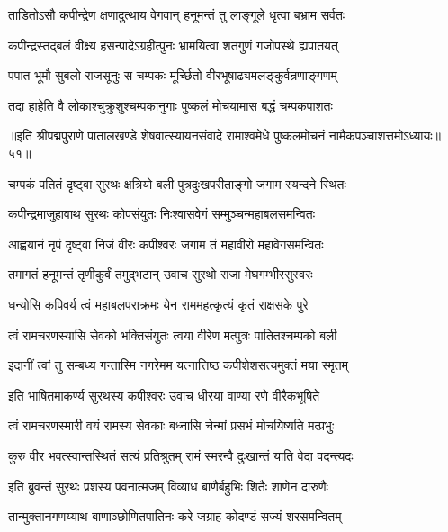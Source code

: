 \twolineshloka
{ताडितोऽसौ कपीन्द्रेण क्षणादुत्थाय वेगवान्}
{हनूमन्तं तु लाङ्गूले धृत्वा बभ्राम सर्वतः}%

\twolineshloka
{कपीन्द्रस्तद्बलं वीक्ष्य हसन्पादेऽग्रहीत्पुनः}
{भ्रामयित्वा शतगुणं गजोपस्थे ह्यपातयत्}%

\twolineshloka
{पपात भूमौ सुबलो राजसूनुः स चम्पकः}
{मूर्च्छितो वीरभूषाढ्यमलङ्कुर्वन्रणाङ्गणम्}%

\twolineshloka
{तदा हाहेति वै लोकाश्चुक्रुशुश्चम्पकानुगाः}
{पुष्कलं मोचयामास बद्धं चम्पकपाशतः}%

{॥इति श्रीपद्मपुराणे पातालखण्डे शेषवात्स्यायनसंवादे रामाश्वमेधे पुष्कलमोचनं नामैकपञ्चाशत्तमोऽध्यायः॥५१॥}



\twolineshloka
{चम्पकं पतितं दृष्ट्वा सुरथः क्षत्रियो बली}
{पुत्रदुःखपरीताङ्गो जगाम स्यन्दने स्थितः}%

\twolineshloka
{कपीन्द्रमाजुहावाथ सुरथः कोपसंयुतः}
{निःश्वासवेगं सम्मुञ्चन्महाबलसमन्वितः}%

\twolineshloka
{आह्वयानं नृपं दृष्ट्वा निजं वीरः कपीश्वरः}
{जगाम तं महावीरो महावेगसमन्वितः}%

\twolineshloka
{तमागतं हनूमन्तं तृणीकुर्वं तमुद्भटान्}
{उवाच सुरथो राजा मेघगम्भीरसुस्वरः}%


\twolineshloka
{धन्योसि कपिवर्य त्वं महाबलपराक्रमः}
{येन राममहत्कृत्यं कृतं राक्षसके पुरे}%

\twolineshloka
{त्वं रामचरणस्यासि सेवको भक्तिसंयुतः}
{त्वया वीरेण मत्पुत्रः पातितश्चम्पको बली}%

\twolineshloka
{इदानीं त्वां तु सम्बध्य गन्तास्मि नगरेमम}
{यत्नात्तिष्ठ कपीशेशसत्यमुक्तं मया स्मृतम्}%

\twolineshloka
{इति भाषितमाकर्ण्य सुरथस्य कपीश्वरः}
{उवाच धीरया वाण्या रणे वीरैकभूषिते}%


\twolineshloka
{त्वं रामचरणस्मारी वयं रामस्य सेवकाः}
{बध्नासि चेन्मां प्रसभं मोचयिष्यति मत्प्रभुः}%

\twolineshloka
{कुरु वीर भवत्स्वान्तस्थितं सत्यं प्रतिश्रुतम्}
{रामं स्मरन्वै दुःखान्तं याति वेदा वदन्त्यदः}%


\twolineshloka
{इति ब्रुवन्तं सुरथः प्रशस्य पवनात्मजम्}
{विव्याध बाणैर्बहुभिः शितैः शाणेन दारुणैः}%

\twolineshloka
{तान्मुक्तानगणय्याथ बाणाञ्छोणितपातिनः}
{करे जग्राह कोदण्डं सज्यं शरसमन्वितम्}%

